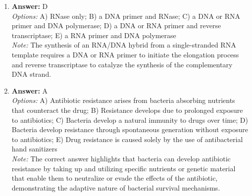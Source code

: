 \documentclass[12pt]{article}
\begin{document}
\begin{enumerate}[label=\arabic*.]
\item \textbf{Answer:} D
\\ \textit{Options:} A) RNase only; B) a DNA primer and RNase; C) a DNA or RNA primer and DNA polymerase; D) a DNA or RNA primer and reverse transcriptase; E) a RNA primer and DNA polymerase
\\ \textit{Note:} The synthesis of an RNA/DNA hybrid from a single-stranded RNA template requires a DNA or RNA primer to initiate the elongation process and reverse transcriptase to catalyze the synthesis of the complementary DNA strand.
\item \textbf{Answer:} A
\\ \textit{Options:} A) Antibiotic resistance arises from bacteria absorbing nutrients that counteract the drug; B) Resistance develops due to prolonged exposure to antibiotics; C) Bacteria develop a natural immunity to drugs over time; D) Bacteria develop resistance through spontaneous generation without exposure to antibiotics; E) Drug resistance is caused solely by the use of antibacterial hand sanitizers
\\ \textit{Note:} The correct answer highlights that bacteria can develop antibiotic resistance by taking up and utilizing specific nutrients or genetic material that enable them to neutralize or evade the effects of the antibiotic, demonstrating the adaptive nature of bacterial survival mechanisms.
\end{enumerate}
\end{document}
